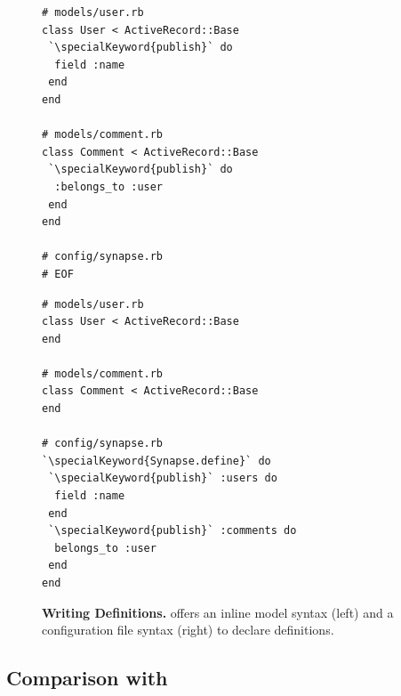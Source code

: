 \begin{figure}
\centering
\begin{minipage}{1.0\textwidth}
\begin{minipage}{.45\textwidth}
\begin{rbox}
\begin{lstlisting}
# models/user.rb
class User < ActiveRecord::Base
 `\specialKeyword{publish}` do
  field :name
 end
end

# models/comment.rb
class Comment < ActiveRecord::Base
 `\specialKeyword{publish}` do
  :belongs_to :user
 end
end

# config/synapse.rb
# EOF
\end{lstlisting}
\end{rbox}
\end{minipage}
\hspace{0.3in}
\begin{minipage}{.45\textwidth}
  \begin{rbox}
\begin{lstlisting}
# models/user.rb
class User < ActiveRecord::Base
end

# models/comment.rb
class Comment < ActiveRecord::Base
end

# config/synapse.rb
`\specialKeyword{Synapse.define}` do
 `\specialKeyword{publish}` :users do
  field :name
 end
 `\specialKeyword{publish}` :comments do
  belongs_to :user
 end
end
\end{lstlisting}
\end{rbox}
\end{minipage}
\end{minipage}
  \caption{{\bf Writing Definitions.} \synapse offers an inline model syntax (left) and
                             a configuration file syntax (right) to declare definitions.}
\label{synapse:fig:conf}
\end{figure}


\subsection{Comparison with \scribe}
\label{synapse:sec:record-replay}


